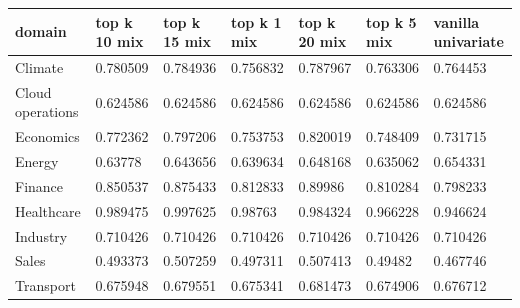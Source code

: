 \begin{tabular}{lllllll}
\toprule
domain & top k 10 mix & top k 15 mix & top k 1 mix & top k 20 mix & top k 5 mix & vanilla univariate \\
\midrule
Climate & 0.780509 & 0.784936 & 0.756832 & 0.787967 & 0.763306 & 0.764453 \\
Cloud operations & 0.624586 & 0.624586 & 0.624586 & 0.624586 & 0.624586 & 0.624586 \\
Economics & 0.772362 & 0.797206 & 0.753753 & 0.820019 & 0.748409 & 0.731715 \\
Energy & 0.63778 & 0.643656 & 0.639634 & 0.648168 & 0.635062 & 0.654331 \\
Finance & 0.850537 & 0.875433 & 0.812833 & 0.89986 & 0.810284 & 0.798233 \\
Healthcare & 0.989475 & 0.997625 & 0.98763 & 0.984324 & 0.966228 & 0.946624 \\
Industry & 0.710426 & 0.710426 & 0.710426 & 0.710426 & 0.710426 & 0.710426 \\
Sales & 0.493373 & 0.507259 & 0.497311 & 0.507413 & 0.49482 & 0.467746 \\
Transport & 0.675948 & 0.679551 & 0.675341 & 0.681473 & 0.674906 & 0.676712 \\
\bottomrule
\end{tabular}
